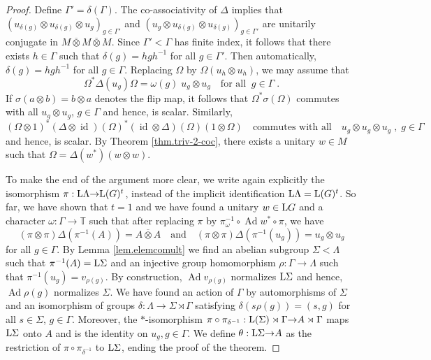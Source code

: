 \documentclass[a4paper,11pt]{amsart}
\numberwithin{equation}{section}
\begin{document}
\begin{proof}
Define $\Gamma' = \delta(\Gamma)$. The co-associativity of ${\Delta}$ implies that $(u_{\delta(g)} {\otimes} u_{\delta(g)} {\otimes} u_g)_{g \in \Gamma'}$ and $(u_g {\otimes} u_{\delta(g)} {\otimes} u_{\delta(g)})_{g \in \Gamma'}$ are unitarily conjugate in $M {\mathbin{\overline{\otimes}}} M {\mathbin{\overline{\otimes}}} M$. Since $\Gamma' < \Gamma$ has finite index, it follows that there exists $h \in \Gamma$ such that $\delta(g) = h g h^{-1}$ for all $g \in \Gamma'$. Then automatically, $\delta(g) = h g h^{-1}$ for all $g \in \Gamma$. Replacing ${\Omega}$ by ${\Omega}(u_h {\otimes} u_h)$, we may assume that
$${\Omega}^*{\Delta}(u_g) {\Omega} = {\omega}(g) \; u_g {\otimes} u_g \quad\text{for all}\;\; g \in \Gamma \; .$$
If ${\sigma}(a {\otimes} b) = b {\otimes} a$ denotes the flip map, it follows that ${\Omega}^* {\sigma}({\Omega})$ commutes with all $u_g {\otimes} u_g$, $g \in \Gamma$ and hence, is scalar. Similarly,
$$({\Omega} {\otimes} 1)^* ({\Delta} {\otimes} {\mathord{\operatorname{id}}})({\Omega})^* ({\mathord{\operatorname{id}}} {\otimes} {\Delta})({\Omega})(1 {\otimes} {\Omega}) \quad\text{commutes with all}\quad u_g {\otimes} u_g {\otimes} u_g \; , \; g \in \Gamma$$
and hence, is scalar. By Theorem \ref{thm.triv-2-coc}, there exists a unitary $w \in M$ such that ${\Omega} = {\Delta}(w^*)(w {\otimes} w)$.

To make the end of the argument more clear, we write again explicitly the isomorphism $\pi : {\mathord{\text{\rm L}}} \Lambda {\rightarrow} {\mathord{\text{\rm L}}}(G)^t$, instead of the implicit identification ${\mathord{\text{\rm L}}} \Lambda = {\mathord{\text{\rm L}}}(G)^t$. So far, we have shown that $t=1$ and we have found a unitary $w \in {\mathord{\text{\rm L}}} G$ and a character ${\omega} : \Gamma {\rightarrow} {\mathbb{T}}$ such that after replacing $\pi$ by $\pi_{\omega}^{-1} \circ {\operatorname{Ad}} w^* \circ \pi$, we have
$$(\pi {\otimes} \pi){\Delta}(\pi^{-1}(A)) = A {\mathbin{\overline{\otimes}}} A \quad\text{and}\quad (\pi {\otimes} \pi){\Delta}(\pi^{-1}(u_g)) = u_g {\otimes} u_g$$
for all $g \in \Gamma$. By Lemma \ref{lem.elemcomult} we find an abelian subgroup $\Sigma < \Lambda$ such that $\pi^{-1}(A) = {\mathord{\text{\rm L}}} \Sigma$ and an injective group homomorphism $\rho : \Gamma {\rightarrow} \Lambda$ such that $\pi^{-1}(u_g) = v_{\rho(g)}$. By construction, ${\operatorname{Ad}} v_{\rho(g)}$ normalizes ${\mathord{\text{\rm L}}} \Sigma$ and hence, ${\operatorname{Ad}} \rho(g)$ normalizes $\Sigma$. We have found an action of $\Gamma$ by automorphisms of $\Sigma$ and an isomorphism of groups $\delta : \Lambda {\rightarrow} \Sigma \rtimes \Gamma$ satisfying $\delta(s \rho(g)) = (s,g)$ for all $s \in \Sigma$, $g \in \Gamma$. Moreover, the $*$-isomorphism $\pi \circ \pi_{\delta^{-1}} : {\mathord{\text{\rm L}}}(\Sigma) \rtimes \Gamma {\rightarrow} A \rtimes \Gamma$ maps ${\mathord{\text{\rm L}}} \Sigma$ onto $A$ and is the identity on $u_g, g \in \Gamma$. We define $\theta : {\mathord{\text{\rm L}}} \Sigma {\rightarrow} A$ as the restriction of $\pi \circ \pi_{\delta^{-1}}$ to ${\mathord{\text{\rm L}}} \Sigma$, ending the proof of the theorem.
\end{proof}
\end{document}
